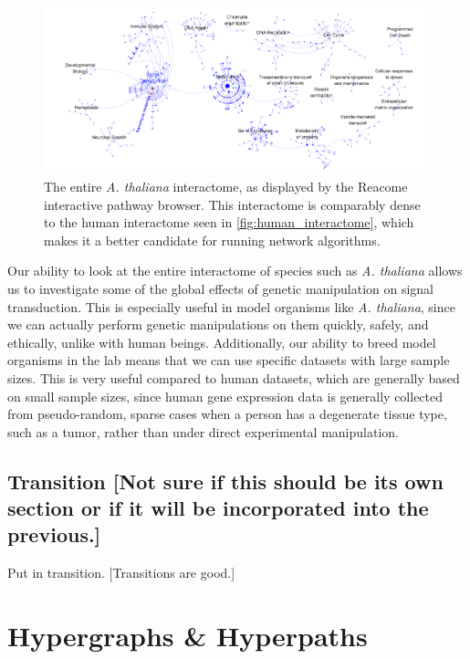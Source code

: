 \documentclass[12pt,twoside]{reedthesis}
\newcommand{\new}[2]{{\color{purple}#1 [#2]}}
\theoremstyle{definition}
\begin{document}
\begin{figure}[h]
  \begin{center}
    \includegraphics[width=\textwidth]{at_interactome}
  \caption[\textit{Arabidopsis thaliana} interactome]{The entire \textit{A. thaliana}  interactome, as displayed by the Reacome interactive pathway browser. This interactome is comparably dense to the human interactome seen in \ref{fig:human_interactome}, which makes it a better candidate for running network algorithms.}
  \label{fig:at_interactome}
  \end{center}
\end{figure}

Our ability to look at the entire interactome of species such as \textit{A. thaliana} allows us to investigate some of the global effects of genetic manipulation on signal transduction. This is especially useful in model organisms like \textit{A. thaliana}, since we can actually perform genetic manipulations on them quickly, safely, and ethically, unlike with human beings. Additionally, our ability to breed model organisms in the lab means that we can use specific datasets with large sample sizes. This is very useful compared to human datasets, which are generally based on small sample sizes, since human gene expression data is generally collected from pseudo-random, sparse cases when a person has a degenerate tissue type, such as a tumor, rather than under direct experimental manipulation.\par

\section{\new{Transition}{Not sure if this should be its own section or if it will be incorporated into the previous.}}

\new{Put in transition.}{Transitions are good.}

\chapter{Hypergraphs \& Hyperpaths}
\end{document}
